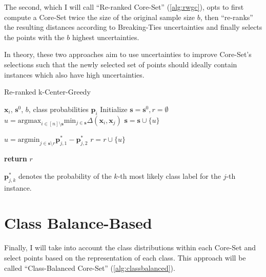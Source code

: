\documentclass[english,bachelor,ul]{webisthesis} %
\begin{document}
The second, which I will call ``Re-ranked Core-Set'' (\ref{alg:rwgc}), opts to first compute a Core-Set twice the size of the original sample size $b$, then ``re-ranks'' the resulting distances according to Breaking-Ties uncertainties and finally selects the points with the $b$ highest uncertainties.

In theory, these two approaches aim to use uncertainties to improve Core-Set's selections such that the newly selected set of points should ideally contain instances which also have high uncertainties.

\begin{algorithm}[htpb]
\caption{Re-ranked k-Center-Greedy}%
\makeatletter{}\makeatother
\label{alg:rwgc}
\begin{algorithmic}

\Require $ \mathbf{x}_i $, $ \mathbf{s}^0 $, $ b $, class probabilities $ \mathbf{p}_i $
\State Initialize $ \mathbf{s} = \mathbf{s}^0, r = \emptyset $
\Repeat
\State $ u = \text{argmax}_{i \in [n] \setminus \mathbf{s}} \text{min}_{j \in \mathbf{s}} \Delta(\mathbf{x}_i, \mathbf{x}_j) $
\State $ \mathbf{s} = \mathbf{s} \cup \{u\} $



\Repeat
\State $ u = \text{argmin}_{j \in \mathbf{s} \setminus r}\mathbf{p}_{j, 1}^* - \mathbf{p}_{j, 2}^* $
\State $ r = r \cup \{u\} $

\State \textbf{return} $ r $
\end{algorithmic}
\end{algorithm}
\noindent $ \mathbf{p}_{j, k}^* $ denotes the probability of the $ k $-th most likely class label for the $ j $-th instance.

\section{Class Balance-Based}

Finally, I will take into account the class distributions within each Core-Set and select points based on the representation of each class. This approach will be called ``Class-Balanced Core-Set'' (\ref{alg:classbalanced}).
\end{document}
